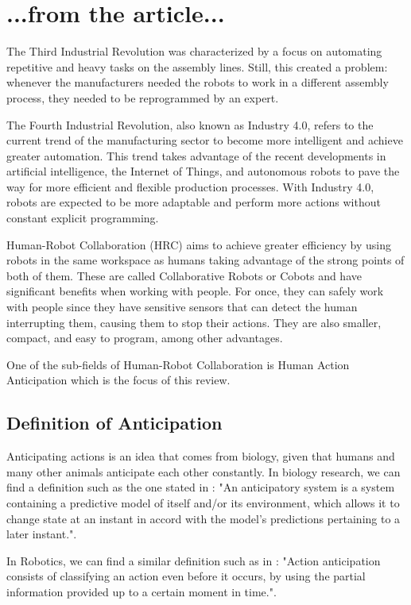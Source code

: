 {\color{red} 
\section{...from the article...}

The Third Industrial Revolution was characterized by a focus on automating repetitive and heavy tasks on the assembly lines. Still, this created a problem: whenever the manufacturers needed the robots to work in a different assembly process, they needed to be reprogrammed by an expert.

The Fourth Industrial Revolution, also known as Industry 4.0, refers to the current trend of the manufacturing sector to become more intelligent and achieve greater automation. This trend takes advantage of the recent developments in artificial intelligence, the Internet of Things, and autonomous robots to pave the way for more efficient and flexible production processes. With Industry 4.0, robots are expected to be more adaptable and perform more actions without constant explicit programming. 

Human-Robot Collaboration (HRC) aims to achieve greater efficiency by using robots in the same workspace as humans taking advantage of the strong points of both of them. These are called Collaborative Robots or Cobots and have significant benefits when working with people. For once, they can safely work with people since they have sensitive sensors that can detect the human interrupting them, causing them to stop their actions. They are also smaller, compact, and easy to program, among other advantages.\cite{CobotsWW}

One of the sub-fields of Human-Robot Collaboration is Human Action Anticipation which is the focus of this review.

\subsection{Definition of Anticipation}
 Anticipating actions is an idea that comes from biology, given that humans and many other animals anticipate each other constantly. In biology research, we can find a definition such as the one stated in \cite{Rosen1985}: "An anticipatory system is a system containing a predictive model of itself and/or its environment, which allows it to change state at an instant in accord with the model's predictions pertaining to a later instant.".
 
 In Robotics, we can find a similar definition such as in \cite{Canuto2021}: "Action anticipation consists of classifying an action even before it occurs, by using the partial information provided up to a certain moment in time.".

}
